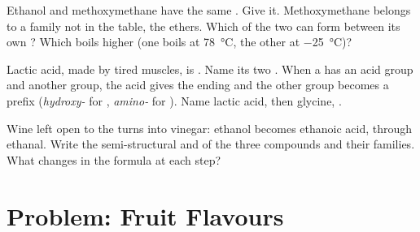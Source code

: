 \begin{exercise}[$\star\star\star$]\label{exo:g11:functional-groups:13}
Ethanol  and methoxymethane  have the same
. Give it. Methoxymethane belongs to a family not in
the table, the ethers. Which of the two can form  between
its own ? Which boils higher (one boils at \qty{78}{\celsius},
the other at \qty{-25}{\celsius})?
\end{exercise}

\begin{exercise}[$\star\star\star$]\label{exo:g11:functional-groups:14}
Lactic acid, made by tired muscles, is
. Name its two . When a
 has an acid group and another group, the acid gives the ending
and the other group becomes a prefix (\emph{hydroxy-} for ,
\emph{amino-} for ). Name lactic acid, then glycine,
.
\end{exercise}

\begin{exercise}[$\star\star\star$]\label{exo:g11:functional-groups:15}
Wine left open to the  turns into vinegar: ethanol becomes ethanoic
acid, through ethanal. Write the semi-structural and 
of the three compounds and their families. What changes in the formula
at each step?
\end{exercise}

\section{Problem: Fruit Flavours}

